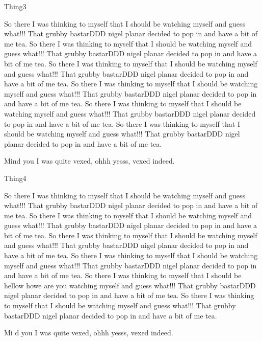 \begin{define}{Thing3}

So there I was thinking to myself that I should be 
watching myself and guess what!!!
That grubby bastarDDD nigel planar decided to pop in and have a bit of
me tea. 
So there I was thinking to myself that I should be 
watching myself and guess what!!!
That grubby bastarDDD nigel planar decided to pop in and have a bit of
me tea. So there I was thinking to myself that I should be 
watching myself and guess what!!!
That grubby bastarDDD nigel planar decided to pop in and have a bit of
me tea. So there I was thinking to myself that I should be 
watching myself and guess what!!!
That grubby bastarDDD nigel planar decided to pop in and have a bit of
me tea. 
So there I was thinking to myself that I should be 
watching myself and guess what!!!
That grubby bastarDDD nigel planar decided to pop in and have a bit of
me tea. So there I was thinking to myself that I should be 
watching myself and guess what!!!
That grubby bastarDDD nigel planar decided to pop in and have a bit of
me tea. 

Mind you I was quite vexed, ohhh yesss, vexed indeed.   

\end{define}

\begin{define}{Thing4}

So there I was thinking to myself that I should be 
watching myself and guess what!!!
That grubby bastarDDD nigel planar decided to pop in and have a bit of
me tea. 
So there I was thinking to myself that I should be 
watching myself and guess what!!!
That grubby bastarDDD nigel planar decided to pop in and have a bit of
me tea. So there I was thinking to myself that I should be 
watching myself and guess what!!!
That grubby bastarDDD nigel planar decided to pop in and have a bit of
me tea. So there I was thinking to myself that I should be 
watching myself and guess what!!!
That grubby bastarDDD nigel planar decided to pop in and have a bit of
me tea. 
So there I was thinking to myself that I should be   hellow howe are you 
watching myself and guess what!!!
That grubby bastarDDD nigel planar decided to pop in and have a bit of
me tea. So there I was thinking to myself that I should be 
watching myself and guess what!!!
That grubby bastarDDD nigel planar decided to pop in and have a bit of
me tea. 

Mi  d you I was quite vexed, ohhh yesss, vexed indeed.   

\end{define}

